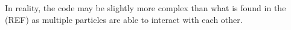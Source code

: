 	

In reality, the code may be slightly more complex than what is found in the (REF) as multiple particles are able to interact with each other.

